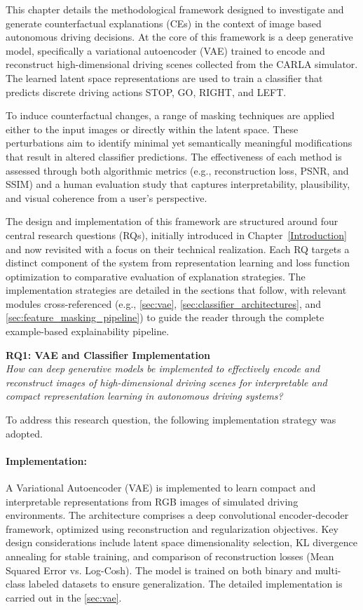 This chapter details the methodological framework designed to investigate and generate counterfactual explanations (CEs) in the context of image based autonomous driving decisions. At the core of this framework is a deep generative model, specifically a variational autoencoder (VAE) trained to encode and reconstruct high-dimensional driving scenes collected from the CARLA simulator. The learned latent space representations are used to train a classifier that predicts discrete driving actions STOP, GO, RIGHT, and LEFT.

To induce counterfactual changes, a range of masking techniques are applied either to the input images or directly within the latent space. These perturbations aim to identify minimal yet semantically meaningful modifications that result in altered classifier predictions. The effectiveness of each method is assessed through both algorithmic metrics (e.g., reconstruction loss, PSNR, and SSIM) and a human evaluation study that captures interpretability, plausibility, and visual coherence from a user’s perspective.

The design and implementation of this framework are structured around four central research questions (RQs), initially introduced in Chapter~\ref{Introduction} and now revisited with a focus on their technical realization. Each RQ targets a distinct component of the system from representation learning and loss function optimization to comparative evaluation of explanation strategies. The implementation strategies are detailed in the sections that follow, with relevant modules cross-referenced (e.g., \cref{sec:vae}, \cref{sec:classifier_architectures}, and \cref{sec:feature_masking_pipeline}) to guide the reader through the complete example-based explainability pipeline.

\vspace{1em}

\textbf{RQ1: VAE and Classifier Implementation} \\
\textit{How can deep generative models be implemented to effectively encode and reconstruct images of high-dimensional driving scenes for interpretable and compact representation learning in autonomous driving systems?}

To address this research question, the following implementation strategy was adopted.

\vspace{-1em}

\paragraph{Implementation:} A Variational Autoencoder (VAE) is implemented to learn compact and interpretable representations from RGB images of simulated driving environments. The architecture comprises a deep convolutional encoder-decoder framework, optimized using reconstruction and regularization objectives. Key design considerations include latent space dimensionality selection, KL divergence annealing for stable training, and comparison of reconstruction losses (Mean Squared Error vs. Log-Cosh). The model is trained on both binary and multi-class labeled datasets to ensure generalization. The detailed implementation is carried out in the \cref{sec:vae}.

